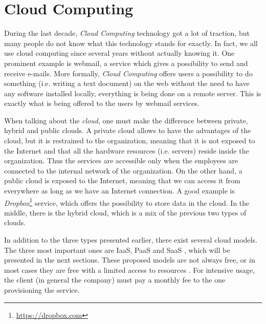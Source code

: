 

\chapter{Cloud Computing}
During the last decade, \textit{Cloud Computing} technology got a lot of traction, but many people do not know what this technology stands for exactly. 
In fact, we all use cloud computing since several years without actually knowing it. One prominent example is webmail, a service which gives a possibility to send and receive e-mails.
More formally, \textit{Cloud Computing} offers users a possibility to do something (i.e. writing a text document) on the web without the need to have any software installed locally, everything is being done on a remote server. 
This is exactly what is being offered to the users by webmail services.

When talking about the \textit{cloud}, one must make the difference between private, hybrid and public clouds. 
A private cloud allows to have the advantages of the cloud, but it is restrained to the organization, meaning that it is not exposed to the Internet and that all the hardware resources (i.e. servers) reside inside the organization. 
Thus the services are accessible only when the employees are connected to the internal network of the organization. 
On the other hand, a public cloud is exposed to the Internet, meaning that we can access it from everywhere as long as we have an Internet connection. 
A good example is \textit{Dropbox}\footnote{\url{https://dropbox.com}} service, which offers the possibility to store data in the cloud. 
In the middle, there is the hybrid cloud, which is a mix of the previous two types of clouds.

In addition to the three types presented earlier, there exist several cloud models.
The three most important ones are IaaS, PaaS and SaaS , which will be presented in the next sections. 
These proposed models are not always free, or in most cases they are free with a limited access to resources . 
For intensive usage, the client (in general the company) must pay a monthly fee to the one provisioning the service.





